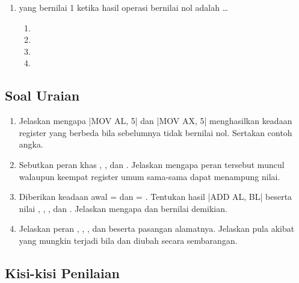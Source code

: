 \begin{enumerate}
    \item {} yang bernilai 1 ketika hasil operasi bernilai
          nol adalah \dots
          \begin{enumerate}
              \item {} \item {}
              \item {} \item {}
          \end{enumerate}
\end{enumerate}

\subsection{Soal Uraian}

\begin{enumerate}
    \item Jelaskan mengapa \lstasm|MOV AL, 5| dan \lstasm|MOV AX, 5|
          menghasilkan keadaan register yang berbeda bila sebelumnya
           tidak bernilai nol. Sertakan contoh angka.

    \item Sebutkan peran khas , , dan .
          Jelaskan mengapa peran tersebut muncul walaupun keempat
          register umum sama-sama dapat menampung nilai.

    \item Diberikan keadaan awal  =  dan
           = . Tentukan hasil
          \lstasm|ADD AL, BL| beserta nilai , ,
          , dan . Jelaskan mengapa  dan
           bernilai demikian.

    \item Jelaskan peran , , , dan 
          beserta pasangan alamatnya. Jelaskan pula akibat yang
          mungkin terjadi bila  dan  diubah secara
          sembarangan.
\end{enumerate}

\subsection{Kisi-kisi Penilaian}

